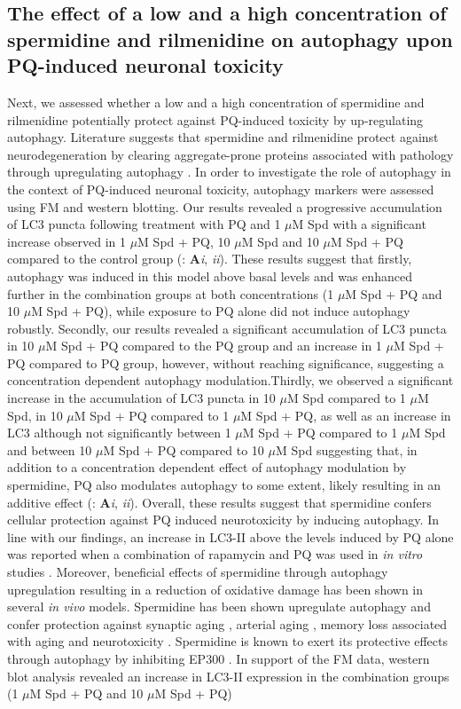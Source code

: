 \subsection{The effect of a low and a high concentration of spermidine and rilmenidine on autophagy upon PQ-induced neuronal toxicity}
Next, we assessed whether a low and a high concentration of spermidine and rilmenidine potentially protect against PQ-induced toxicity by up-regulating autophagy. Literature suggests that spermidine and rilmenidine protect against neurodegeneration by clearing aggregate-prone proteins associated with pathology through upregulating autophagy \citep{Buttner2014,Rose2010}. In order to investigate the role of autophagy in the context of PQ-induced neuronal toxicity, autophagy markers were assessed using FM and western blotting. Our results revealed a progressive accumulation of LC3 puncta following treatment with PQ and 1 $\mu$M Spd with a significant increase observed in 1 $\mu$M Spd + PQ, 10 $\mu$M Spd and 10 $\mu$M Spd + PQ compared to the control group (: \textbf{A}\textit{i}, \textit{ii}). These results suggest that firstly, autophagy was induced in this model above basal levels and was enhanced further in the combination groups at both concentrations (1 $\mu$M Spd + PQ and 10 $\mu$M Spd + PQ), while exposure to PQ alone did not induce autophagy robustly. Secondly, our results revealed a significant accumulation of LC3 puncta in 10 $\mu$M Spd + PQ compared to the PQ group and an increase in 1 $\mu$M Spd + PQ compared to PQ group, however, without reaching significance, suggesting a concentration dependent autophagy modulation.Thirdly, we observed a significant increase in the accumulation of LC3 puncta in 10 $\mu$M Spd compared to 1 $\mu$M Spd, in 10 $\mu$M Spd + PQ compared to 1 $\mu$M Spd + PQ, as well as an increase in LC3 although not significantly between 1 $\mu$M Spd + PQ compared to 1 $\mu$M Spd  and between 10 $\mu$M Spd + PQ compared to 10 $\mu$M Spd suggesting that, in addition to a concentration dependent effect of autophagy modulation by spermidine, PQ also modulates autophagy to some extent, likely resulting in an additive effect (: \textbf{A}\textit{i}, \textit{ii}). Overall, these results suggest that spermidine confers cellular protection against PQ induced neurotoxicity by inducing autophagy. In line with our findings, an increase in LC3-II above the levels induced by PQ alone was reported when a combination of rapamycin and PQ was used in \textit{in vitro} studies \citep{Gonzalez-Polo2007a}. Moreover, beneficial effects of spermidine through autophagy upregulation resulting in a reduction of oxidative damage has been shown in several  \textit{in vivo} models. Spermidine has been shown upregulate autophagy and confer protection against synaptic aging \citep{Bhukel2017}, arterial aging \citep{LaRocca2013}, memory loss associated with aging \citep{Gupta2013,Sigrist2014,Wirth2018} and neurotoxicity \citep{Buttner2014,Yang2017}. Spermidine is known to exert its protective effects through autophagy by inhibiting EP300 \citep{Pietrocola2015}. In support of the FM data, western blot analysis revealed an increase in LC3-II expression in the combination groups (1 $\mu$M Spd + PQ and 10 $\mu$M Spd + PQ) 